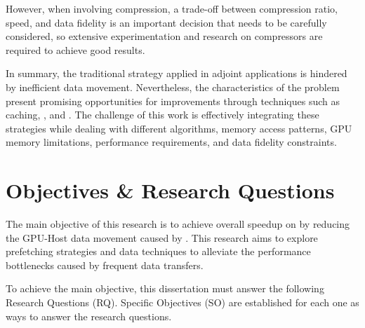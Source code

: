 \documentclass[Ingles]{ic-tese-v3}
\begin{document}
However, when involving compression, a trade-off between compression ratio, speed, and data fidelity is an important decision that needs to be carefully considered, so extensive experimentation and research on compressors are required to achieve good results.

In summary, the traditional \checkpointing strategy applied in adjoint applications is hindered by inefficient data movement. Nevertheless, the characteristics of the problem present promising opportunities for improvements through techniques such as caching, \prefetching, and \compression. The challenge of this work is effectively integrating these strategies while dealing with different \checkpointing algorithms, memory access patterns, GPU memory limitations, performance requirements, and data fidelity constraints.

\section{Objectives \& Research Questions}
The main objective of this research is to achieve overall speedup on \awave by reducing the GPU-Host data movement caused by \checkpointing. This research aims to explore prefetching strategies and data \compression techniques to alleviate the performance bottlenecks caused by frequent data transfers.

To achieve the main objective, this dissertation must answer the following Research Questions (RQ). Specific Objectives (SO) are established for each one as ways to answer the research questions.
\end{document}
